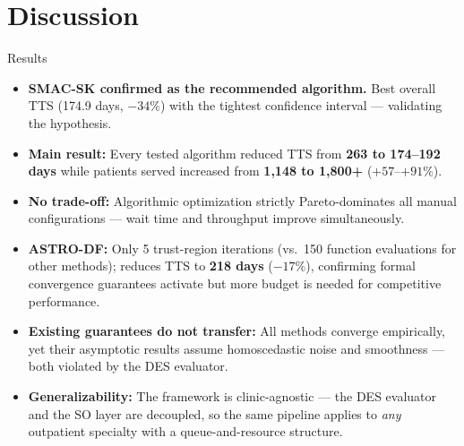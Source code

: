 \documentclass[xcolor=svgnames]{beamer}
\begin{document}
\section{Discussion}
\begin{frame}{Results}
	\justifying
	\begin{itemize}[<+->]
		\item \textbf{SMAC-SK confirmed as the recommended algorithm.}
		      Best overall TTS (174.9 days, $-34\%$) with the tightest
		      confidence interval --- validating the hypothesis.

		\item \textbf{Main result:} Every tested algorithm reduced TTS from
		\textbf{263 to 174--192 days} while patients served
		increased from \textbf{1{,}148 to 1{,}800+} ($+57$--$+91\%$).


		\item \textbf{No trade-off:} Algorithmic optimization strictly
		Pareto-dominates all manual configurations --- wait time
		and throughput improve simultaneously.

		\item \textbf{ASTRO-DF:} Only 5 trust-region iterations (vs.\ 150
		function evaluations for other methods); reduces TTS to
		\textbf{218 days} ($-17\%$), confirming formal convergence
		guarantees activate but more budget is needed for competitive performance.

		\item \textbf{Existing guarantees do not transfer:} All methods
		converge empirically, yet their asymptotic results assume
		homoscedastic noise and smoothness --- both violated by
		the DES evaluator.

		\item \textbf{Generalizability:} The framework is clinic-agnostic ---
		the DES evaluator and the SO layer are decoupled, so the same
		pipeline applies to \emph{any} outpatient specialty with a
		queue-and-resource structure.

	\end{itemize}
\end{frame}
\end{document}
